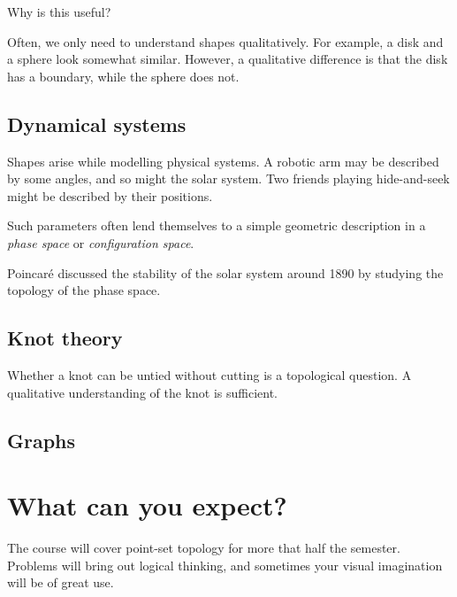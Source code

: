 Why is this useful?

Often, we only need to understand shapes qualitatively.
For example, a disk and a sphere look somewhat similar.
However, a qualitative difference is that the disk has a boundary,
while the sphere does not.
\begin{center}
    \quad%
\end{center}

\subsection*{Dynamical systems} \label{sec:dynamical}
Shapes arise while modelling physical systems.
A robotic arm may be described by some angles,
and so might the solar system.
Two friends playing hide-and-seek might be described by their positions.

Such parameters often lend themselves to a simple geometric description
in a \emph{phase space} or \emph{configuration space}.

Poincar\'e discussed the stability of the solar system around 1890
by studying the topology of the phase space.

\subsection*{Knot theory} \label{sec:knot}
Whether a knot can be untied without cutting is a topological question.
A qualitative understanding of the knot is sufficient.

\subsection*{Graphs} \label{sec:graphs}

\section{What can you expect?} \label{sec:overview}
The course will cover point-set topology for more that half the semester.
Problems will bring out logical thinking, and sometimes your visual
imagination will be of great use.

